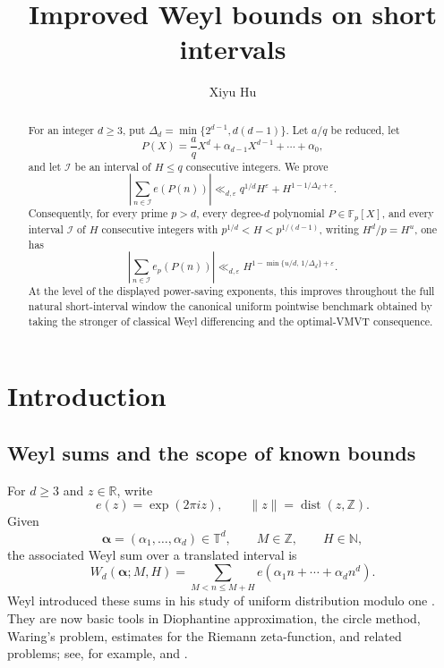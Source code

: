 \documentclass[11pt,reqno]{amsart}
\title{Improved Weyl bounds on short intervals}
\author{Xiyu Hu}
\date{}
\numberwithin{equation}{section}
\theoremstyle{definition}
\theoremstyle{remark}
\begin{document}
\begin{abstract}
For an integer $d\ge3$, put
$\Delta_d=\min\{2^{d-1},d(d-1)\}$.  Let $a/q$ be reduced, let
\[
  P(X)=\frac aqX^d+\alpha_{d-1}X^{d-1}+\cdots+\alpha_0,
\]
and let $\mathcal I$ be an interval of $H\le q$ consecutive integers.  We prove
\[
  \left|\sum_{n\in\mathcal I}e(P(n))\right|
  \ll_{d,\varepsilon}
  q^{1/d}H^\varepsilon+H^{1-1/\Delta_d+\varepsilon}.
\]
Consequently, for every prime $p>d$, every degree-$d$ polynomial
$P\in\mathbb F_p[X]$, and every interval $\mathcal I$ of $H$ consecutive
integers with $p^{1/d}<H<p^{1/(d-1)}$, writing $H^d/p=H^u$, one has
\[
  \left|\sum_{n\in\mathcal I}e_p(P(n))\right|
  \ll_{d,\varepsilon}
  H^{1-\min\{u/d,\,1/\Delta_d\}+\varepsilon}.
\]
At the level of the displayed power-saving exponents, this improves throughout
the full natural short-interval window the canonical uniform pointwise
benchmark obtained by taking the stronger of classical Weyl differencing and
the optimal-VMVT consequence.
\end{abstract}

\maketitle
\tableofcontents

\section{Introduction}

\subsection{Weyl sums and the scope of known bounds}

For $d\ge3$ and $z\in\mathbb R$, write
\[
  e(z)=\exp(2\pi iz),
  \qquad
  \|z\|=\operatorname{dist}(z,\mathbb Z).
\]
Given
\[
  \boldsymbol\alpha=(\alpha_1,\ldots,\alpha_d)\in\mathbb T^d,
  \qquad M\in\mathbb Z,
  \qquad H\in\mathbb N,
\]
the associated Weyl sum over a translated interval is
\begin{equation}\label{eq:intro-general-weyl-sum}
  W_d(\boldsymbol\alpha;M,H)
  =
  \sum_{M<n\le M+H}
  e(\alpha_1n+\cdots+\alpha_dn^d).
\end{equation}
Weyl introduced these sums in his study of uniform distribution modulo one
\cite{Weyl1916}.  They are now basic tools in Diophantine approximation, the
circle method, Waring's problem, estimates for the Riemann zeta-function, and
related problems; see, for example,
\cite{Baker1986,Vaughan1997} and \cite{IwaniecKowalski2004}.
\end{document}
